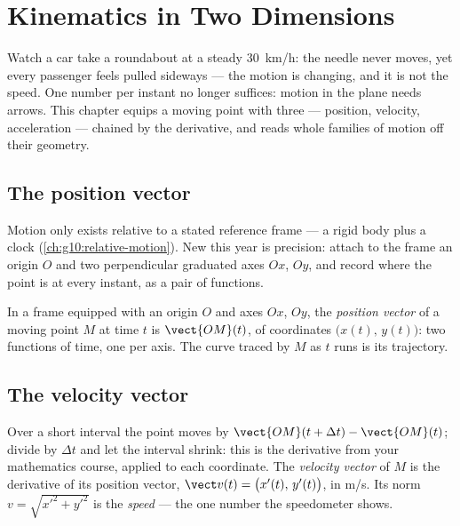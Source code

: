 \chapter{Kinematics in Two Dimensions}\label{ch:g12:kinematics-2d}

Watch a car take a roundabout at a steady \qty{30}{km/h}: the needle
never moves, yet every passenger feels pulled sideways --- the motion
is changing, and it is not the speed. One number per instant no
longer suffices: motion in the plane needs arrows. This chapter
equips a moving point with three --- position, velocity, acceleration
--- chained by the derivative, and reads whole families of motion off
their geometry.

\section{The position vector}

Motion only exists relative to a stated reference frame --- a rigid
body plus a clock (\cref{ch:g10:relative-motion}). New this year is
precision: attach to the frame an origin $O$ and two perpendicular
graduated axes $Ox$, $Oy$, and record where the point is at every
instant, as a pair of functions.

\begin{definition}\label{def:g12:kinematics-2d:position}
In a frame equipped with an origin $O$ and axes $Ox$, $Oy$, the
\emph{position vector} of a moving point $M$
at time $t$ is $\vect{OM}(t)$, of coordinates
$\bigl(x(t),\, y(t)\bigr)$: two functions of time, one per axis. The
curve traced by $M$ as $t$ runs is its trajectory.
\end{definition}

\section{The velocity vector}

\begin{definition}\label{def:g12:kinematics-2d:velocity}
Over a short interval the point moves by
$\vect{OM}(t+\Delta t) - \vect{OM}(t)$; divide by $\Delta t$ and let
the interval shrink: this is the derivative from your mathematics
course, applied to each coordinate. The \emph{velocity
vector} of $M$ is the derivative of its
position vector, $\vect v(t) = \bigl(x'(t),\, y'(t)\bigr)$, in
\unit{m/s}. Its norm $v = \sqrt{x'^2 + y'^2}$ is the
\emph{speed} --- the one number the speedometer shows.
\end{definition}

